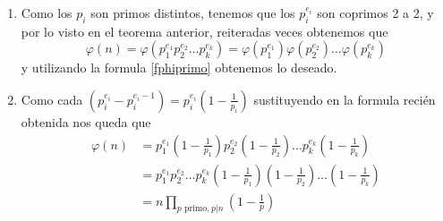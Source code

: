 \documentclass{report}
\begin{document}
\begin{myproof}
    \begin{enumerate}
        \item Como los $p_i$ son primos distintos, tenemos que los $p_i^{e_i}$ son coprimos 2 a 2, y por lo visto en el teorema anterior, reiteradas veces obtenemos que$$\varphi(n)=\varphi(p_1^{e_1}p_2^{e_2}\dots p_k^{e_k})=\varphi(p_1^{e_1})\varphi(p_2^{e_2})\dots\varphi(p_k^{e_k})$$y utilizando la formula \ref{fphiprimo} obtenemos lo deseado.
        \item Como cada $(p_i^{e_i}-p_i^{e_i-1})=p_i^{e_i}\left( 1-\frac{1}{p_i} \right) $ sustituyendo en la formula recién obtenida nos queda que $$\begin{aligned} \varphi ( n) & =p_{1}^{e_{1}}\left( 1-\frac{1}{p_{1}}\right) p_{2}^{e_{2}}\left( 1-\frac{1}{p_{2}}\right) \dotsc p_{k}^{e_{k}}\left( 1-\frac{1}{p_{k}}\right)\\  & =p_{1}^{e_{1}} p_{2}^{e_{2}} \dotsc p_{k}^{e_{k}}\left( 1-\frac{1}{p_{1}}\right)\left( 1-\frac{1}{p_{2}}\right) \dotsc \left( 1-\frac{1}{p_{k}}\right)\\  & =n\prod _{p\text{ primo,} \ p|n}\left( 1-\frac{1}{p}\right) \end{aligned}$$
    \end{enumerate}
\end{myproof}
\end{document}

